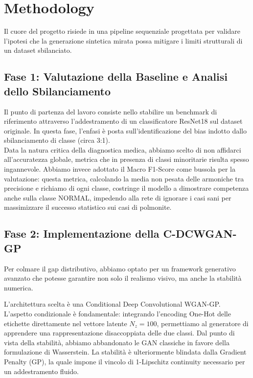 \section{Methodology}

Il cuore del progetto risiede in una pipeline sequenziale progettata per validare l'ipotesi che la generazione sintetica mirata possa mitigare i limiti strutturali di un dataset sbilanciato.

\subsection{Fase 1: Valutazione della Baseline e Analisi dello Sbilanciamento}

Il punto di partenza del lavoro consiste nello stabilire un benchmark di riferimento attraverso l'addestramento di un classificatore ResNet18 sul dataset originale. In questa fase, l'enfasi è posta sull'identificazione del bias indotto dallo sbilanciamento di classe (circa 3:1).\\

Data la natura critica della diagnostica medica, abbiamo scelto di non affidarci all'accuratezza globale, metrica che in presenza di classi minoritarie risulta spesso ingannevole. Abbiamo invece adottato il Macro F1-Score come bussola per la valutazione: questa metrica, calcolando la media non pesata delle armoniche tra precisione e richiamo di ogni classe, costringe il modello a dimostrare competenza anche sulla classe NORMAL, impedendo alla rete di ignorare i casi sani per massimizzare il successo statistico sui casi di polmonite.

\subsection{Fase 2: Implementazione della C-DCWGAN-GP}

Per colmare il gap distributivo, abbiamo optato per un framework generativo avanzato che potesse garantire non solo il realismo visivo, ma anche la stabilità numerica.

L'architettura scelta è una Conditional Deep Convolutional WGAN-GP. L'aspetto condizionale è fondamentale: integrando l'encoding One-Hot delle etichette direttamente nel vettore latente $N_z = 100$, permettiamo al generatore di apprendere una rappresentazione disaccoppiata delle due classi. Dal punto di vista della stabilità, abbiamo abbandonato le GAN classiche in favore della formulazione di Wasserstein. La stabilità è ulteriormente blindata dalla Gradient Penalty (GP), la quale impone il vincolo di 1-Lipschitz continuity necessario per un addestramento fluido.\\

